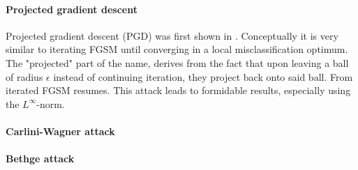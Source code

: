 \documentclass{article}
\begin{document}
\paragraph{Projected gradient descent}
Projected gradient descent (PGD) was first shown in \cite{madry2017towards}. Conceptually it is very similar to iterating FGSM until converging in a local misclassification optimum. The "projected" part of the name, derives from the fact that upon leaving a ball of radius $\epsilon$ instead of continuing iteration, they project back onto said ball. From iterated FGSM resumes.
This attack leads to formidable results, especially using the $L^\infty$-norm.



\paragraph{Carlini-Wagner attack}

\paragraph{Bethge attack}

%
%
%
\end{document}
